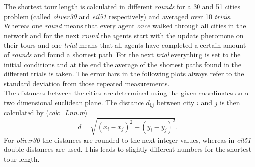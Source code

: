 

The shortest tour length is calculated in different \textit{rounds} for a 30 and 51 cities problem (called \emph{oliver30} and \emph{eil51} respectively) and averaged over 10 \textit{trials}. Whereas one \textit{round} means that every agent \textit{once} walked through all cities in the network and for the next \textit{round} the agents start with the update pheromone on their tours and one \textit{trial} means that all agents have completed a certain amount of \textit{rounds} and found a shortest path. For the next \textit{trial} everything is set to the initial conditions and at the end the average of the shortest paths found in the different trials is taken. The error bars in the following plots always refer to the standard deviation from those repeated measurements.\\
The distances between the cities are determined using the given coordinates on a two dimensional euclidean plane. The distance $d_\text{i,j}$ between city $i$ and $j$ is then calculated by (\textit{calc\_Lnn.m})
\begin{equation}
d = \sqrt{(x_i-x_j)^2+(y_i-y_j)^2}.
\label{eq:dist}
\end{equation}
For \emph{oliver30} the distances are rounded to the next integer values, whereas in \emph{eil51} double distances are used. This leads to slightly different numbers for the shortest tour length.\\
